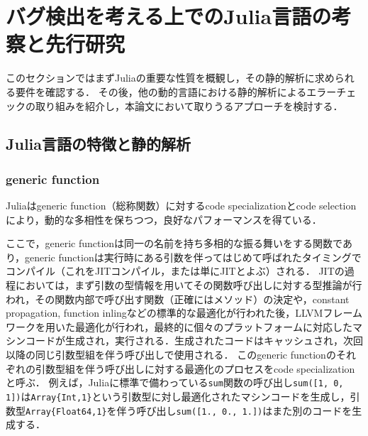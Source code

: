
\section{バグ検出を考える上でのJulia言語の考察と先行研究}

このセクションではまずJuliaの重要な性質を概観し，その静的解析に求められる要件を確認する．
その後，他の動的言語における静的解析によるエラーチェックの取り組みを紹介し，本論文において取りうるアプローチを検討する．

\subsection{Julia言語の特徴と静的解析}


\subsubsection{generic function}

Juliaはgeneric function（総称関数）に対するcode specializationとcode selectionにより，動的な多相性を保ちつつ，良好なパフォーマンスを得ている．

ここで，generic functionは同一の名前を持ち多相的な振る舞いをする関数であり，generic functionは実行時にある引数を伴ってはじめて呼ばれたタイミングでコンパイル（これをJITコンパイル，または単にJITとよぶ）される．
JITの過程においては，まず引数の型情報を用いてその関数呼び出しに対する型推論が行われ，その関数内部で呼び出す関数（正確にはメソッド）の決定や，constant propagation, function inlingなどの標準的な最適化が行われた後，LLVMフレームワーク\cite{LLVM}を用いた最適化が行われ，最終的に個々のプラットフォームに対応したマシンコードが生成され，実行される．生成されたコードはキャッシュされ，次回以降の同じ引数型組を伴う呼び出しで使用される．
このgeneric functionのそれぞれの引数型組を伴う呼び出しに対する最適化のプロセスをcode specializationと呼ぶ．
例えば，Juliaに標準で備わっている\verb|sum|関数の呼び出し\verb|sum([1, 0, 1])|は\verb|Array{Int,1}|という引数型に対し最適化されたマシンコードを生成し，引数型\verb|Array{Float64,1}|を伴う呼び出し\verb|sum([1., 0., 1.])|はまた別のコードを生成する．

